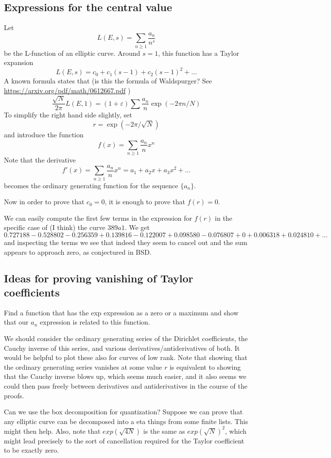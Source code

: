 \documentclass[paper=a4, fontsize=11pt]{scrartcl} %
\numberwithin{equation}{section} %
\numberwithin{figure}{section} %
\numberwithin{table}{section} %
\begin{document}
\subsection{Expressions for the central value}

Let
$$L(E, s) = \sum_{n \geq 1} \frac{a_n}{n^s}$$
be the L-function of an elliptic curve. Around $s=1$, this function has a Taylor expansion
$$ L(E, s) = c_0 + c_1 (s-1) + c_2 (s-1)^2 + \ldots  $$
A known formula states that (is this the formula of Waldspurger? See \url{https://arxiv.org/pdf/math/0612667.pdf} )
$$ \frac{\sqrt{N}}{2 \pi} L(E, 1) = (1 + \varepsilon) \sum \frac{a_n}{n} \exp(-2 \pi n / N)  $$
To simplify the right hand side slightly, set
$$ r = \exp(-2 \pi / \sqrt{N})  $$
and introduce the function
$$  f(x) = \sum_{n \geq 1} \frac{a_n}{n} x^n  $$
Note that the derivative
$$  f'(x) = \sum_{n \geq 1} \frac{a_n}{n} x^n  = a_1 + a_2 x + a_3 x^2 + \ldots  $$
becomes the ordinary generating function for the sequence $\{ a_n \}$.

Now in order to prove that $c_0 = 0$, it is enough to prove that $f(r) = 0$.

We can easily compute the first few terms in the expression for $f(r)$ in the specific case of (I think) the curve $389a1$. We get
$$ 0.727188 - 0.528802 - 0.256359 + 0.139816 - 0.122007 + 0.098580 - 0.076807 + 0 + 0.006318 + 0.024810 + \ldots   $$
and inspecting the terms we see that indeed they seem to cancel out and the sum appears to approach zero, as conjectured in BSD.

\subsection{Ideas for proving vanishing of Taylor coefficients}


Find a function that has the exp expression as a zero or a maximum and show that our $a_n$ expression is related to this function.

We should consider the ordinary generating series of the Dirichlet coefficients, the Cauchy inverse of this series, and various derivatives/antiderivatives of both. It would be helpful to plot these also for curves of low rank. Note that showing that the ordinary generating series vanishes at some value $r$ is equivalent to showing that the Cauchy inverse blows up, which seems much easier, and it also seems we could then pass freely between derivatives and antiderivatives in the course of the proofs.

Can we use the box decomposition for quantization? Suppose we can prove that any elliptic curve can be decomposed into a eta things from some finite lists. This might then help. Also, note that $exp(\sqrt{4N})$ is the same as $exp(\sqrt{N})^2$, which might lead precisely to the sort of cancellation required for the Taylor coefficient to be exactly zero.




\end{document}
